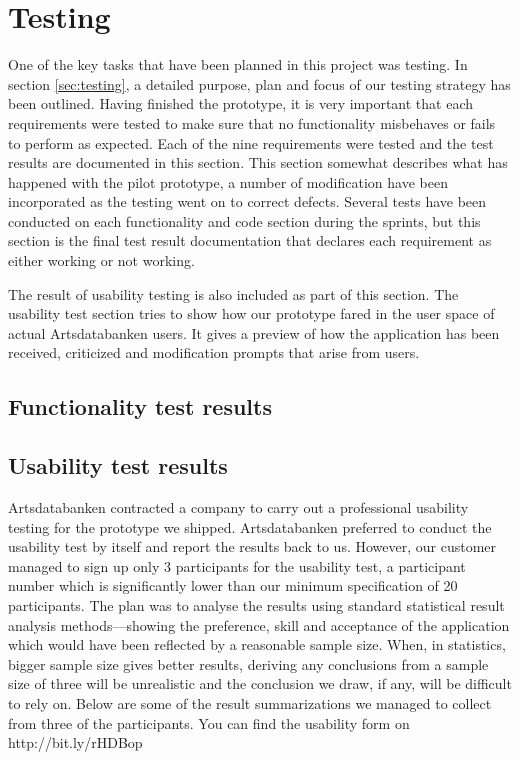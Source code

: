 \section{Testing}
\label{sec:testresult}

One of the key tasks that have been planned in this project was testing. In
section \ref{sec:testing}, a detailed purpose, plan and focus of our testing
strategy has been outlined. Having finished the prototype, it is very important
that each requirements were tested to make sure that no functionality
misbehaves or fails to perform as expected. Each of the nine requirements were
tested and the test results are documented in this section. This section
somewhat describes what has happened with the pilot prototype, a number of
modification have been incorporated as the testing went on to correct defects.
Several tests have been conducted on each functionality and code section during
the sprints, but this section is the final test result documentation that
declares each requirement as either working or not working.

The result of usability testing is also included as part of this section. The
usability test section tries to show how our prototype fared in the user space
of actual Artsdatabanken users. It gives a preview of how the application has
been received, criticized and modification prompts that arise from users.

\subsection{Functionality test results}






\subsection{Usability test results}

Artsdatabanken contracted a company to carry out a professional usability
testing for the prototype we shipped. Artsdatabanken preferred to conduct the
usability test by itself and report the results back to us. However, our
customer managed to sign up only 3 participants for the usability test, a participant number
which is significantly lower than our minimum specification of 20 participants.
The plan was to analyse the results using standard statistical result analysis
methods---showing the preference, skill and acceptance of the application which
would have been reflected by a reasonable sample size. When, in statistics,
bigger sample size gives better results\cite{statistics}, deriving any
conclusions from a sample size of three will be unrealistic and the conclusion we draw, if
any, will be difficult to rely on. Below are some of the result summarizations we managed to collect from three of the participants. You can find the usability form on http://bit.ly/rHDBop

